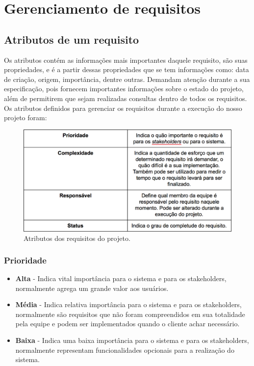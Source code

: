 \chapter[Gerenciamento de requisitos]{Gerenciamento de requisitos}
\section{Atributos de um requisito}
Os atributos contém as informações mais importantes daquele requisito, são suas propriedades, e é a partir dessas propriedades que se tem informações como: data de criação, origem, importância, dentre outras. Demandam atenção durante a sua especificação, pois fornecem importantes informações sobre o estado do projeto, além de permitirem que sejam realizadas consultas dentro de todos os requisitos.
Os atributos definidos para gerenciar os requisitos durante a execução do nosso projeto foram:
  \begin{figure}[!htbp]
    \centering
    \includegraphics[scale=0.5]{editaveis/figuras/tabela_atributos}
    \caption[Atributos dos requisitos do projeto]{Atributos dos requisitos do projeto. \footnotemark}
    \label{tabela_atributos}
  \end{figure}
\subsection{Prioridade}
\begin{itemize}
\item \textbf{Alta} - Indica vital importância para o sistema e para os stakeholders, normalmente agrega um grande valor aos usuários.
\item \textbf{Média} - Indica relativa importância para o sistema e para os stakeholders, normalmente são requisitos que não foram compreendidos em sua totalidade pela equipe e podem ser implementados quando o cliente achar necessário.
\item \textbf{Baixa} - Indica uma baixa importância para o sistema e para os stakeholders, normalmente representam funcionalidades opcionais para a realização do sistema.
\end{itemize}
